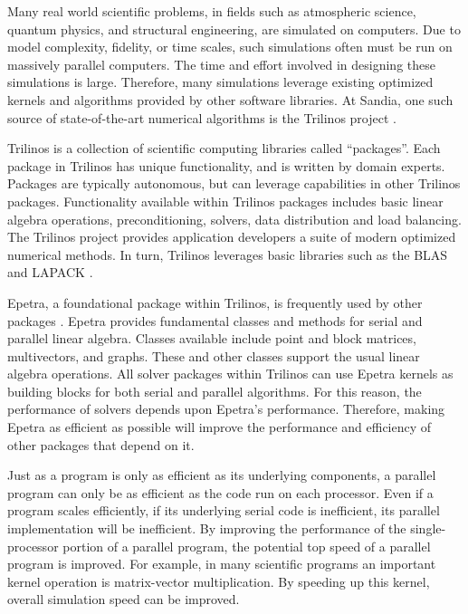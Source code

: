 Many real world scientific problems, in fields such as atmospheric science,
quantum physics, and
structural engineering, are simulated on computers.  Due to model complexity, fidelity, or
time scales, such simulations often must be run on massively parallel computers.
The time and effort involved in designing these simulations is large.
Therefore, many simulations leverage existing optimized kernels and algorithms provided by other software libraries.
At Sandia, one such source of state-of-the-art numerical algorithms is the Trilinos project \cite{IK:Trilinos}.

Trilinos is a collection of scientific computing libraries called ``packages''.  Each package in Trilinos has
unique functionality, and is written by domain experts. Packages are typically autonomous, but can leverage capabilities
in other Trilinos packages.  Functionality available
within Trilinos packages includes basic linear algebra operations, preconditioning, solvers, data distribution and
load balancing.  The Trilinos project provides application developers a suite of modern optimized numerical methods.
In turn, Trilinos leverages basic libraries such as the BLAS \cite{IK:BLAS} and LAPACK \cite{IK:LaPACK}.

Epetra, a foundational package within Trilinos, is frequently used by other packages \cite{IK:Epetra-site}.
Epetra provides fundamental classes and methods for serial and parallel linear algebra.  Classes available include
point and block matrices, multivectors, and graphs.  These and other classes support the usual linear algebra
operations.  All solver packages within Trilinos can use
Epetra kernels as building blocks for both serial and parallel algorithms.  For this reason, the performance of
solvers depends upon Epetra's performance.  Therefore, making Epetra as efficient as
possible will improve the performance and efficiency of other packages that depend on it.

Just as a program is only as efficient as its underlying components, a parallel program can only
be as efficient as the code run on each processor.  Even if a program scales efficiently, if its underlying
serial code is inefficient, its parallel implementation will be inefficient.  By improving the performance of the single-processor
portion of a parallel program, the potential top speed of a parallel program is improved.  For example, in many scientific programs an
important kernel operation is matrix-vector multiplication.  By speeding up this kernel,
overall simulation speed can be improved.

